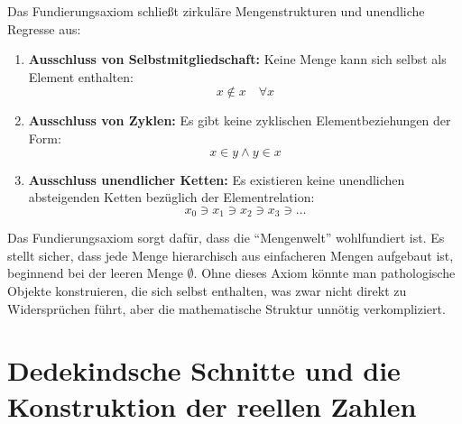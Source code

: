 \begin{math-stroke}

\begin{explanation-of-steps}
Das Fundierungsaxiom schließt zirkuläre Mengenstrukturen und unendliche Regresse aus:
\begin{enumerate}[label=\textbf{(\roman*)}]
    \item \textbf{Ausschluss von Selbstmitgliedschaft:} Keine Menge kann sich selbst als Element enthalten:
    \[
    x \notin x \quad \forall x
    \]
    \item \textbf{Ausschluss von Zyklen:} Es gibt keine zyklischen Elementbeziehungen der Form:
    \[
    x \in y \land y \in x
    \]
    \item \textbf{Ausschluss unendlicher Ketten:} Es existieren keine unendlichen absteigenden Ketten bezüglich der Elementrelation:
    \[
    x_0 \ni x_1 \ni x_2 \ni x_3 \ni \dots
    \]
\end{enumerate}
\end{explanation-of-steps}
\end{math-stroke}

\begin{didactic-insight}
Das Fundierungsaxiom sorgt dafür, dass die "`Mengenwelt"' wohlfundiert ist. Es stellt sicher, dass jede Menge hierarchisch aus einfacheren Mengen aufgebaut ist, beginnend bei der leeren Menge $\emptyset$. Ohne dieses Axiom könnte man pathologische Objekte konstruieren, die sich selbst enthalten, was zwar nicht direkt zu Widersprüchen führt, aber die mathematische Struktur unnötig verkompliziert.
\end{didactic-insight}

\section{Dedekindsche Schnitte und die Konstruktion der reellen Zahlen}

